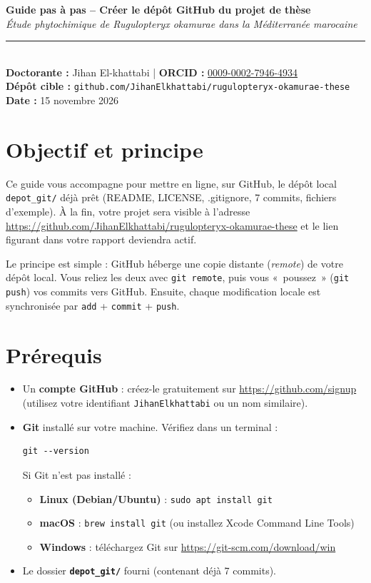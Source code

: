 \documentclass[11pt,a4paper]{article}
\begin{document}
\begin{center}
{\color{accent}\Large\bfseries Guide pas à pas -- Créer le dépôt GitHub du projet de thèse}\\[3pt]
{\large\itshape Étude phytochimique de \textit{Rugulopteryx okamurae} dans la Méditerranée marocaine}\\[4pt]
\rule{0.97\linewidth}{0.6pt}\\[3pt]
\small
\textbf{Doctorante :} Jihan El-khattabi \quad|\quad
\textbf{ORCID :} \href{https://orcid.org/0009-0002-7946-4934}{0009-0002-7946-4934}\\
\textbf{Dépôt cible :} \texttt{github.com/JihanElkhattabi/rugulopteryx-okamurae-these}\\
\textbf{Date :} 15 novembre 2026
\end{center}
\vspace{2pt}

\section{Objectif et principe}
Ce guide vous accompagne pour mettre en ligne, sur GitHub, le dépôt local
\texttt{depot\_git/} déjà prêt (README, LICENSE, .gitignore, 7 commits, fichiers
d'exemple). À la fin, votre projet sera visible à l'adresse
\url{https://github.com/JihanElkhattabi/rugulopteryx-okamurae-these} et le lien
figurant dans votre rapport deviendra actif.

Le principe est simple : GitHub héberge une copie distante (\emph{remote}) de votre
dépôt local. Vous reliez les deux avec \texttt{git remote}, puis vous «~poussez~»
(\texttt{git push}) vos commits vers GitHub. Ensuite, chaque modification locale est
synchronisée par \texttt{add} + \texttt{commit} + \texttt{push}.

\section{Prérequis}
\begin{itemize}
  \item Un \textbf{compte GitHub} : créez-le gratuitement sur \url{https://github.com/signup}
        (utilisez votre identifiant \texttt{JihanElkhattabi} ou un nom similaire).
  \item \textbf{Git} installé sur votre machine. Vérifiez dans un terminal :
\begin{lstlisting}
git --version
\end{lstlisting}
        Si Git n'est pas installé :
        \begin{itemize}
          \item \textbf{Linux (Debian/Ubuntu)} : \texttt{sudo apt install git}
          \item \textbf{macOS} : \texttt{brew install git} (ou installez Xcode Command Line Tools)
          \item \textbf{Windows} : téléchargez Git sur \url{https://git-scm.com/download/win}
        \end{itemize}
  \item Le dossier \textbf{\texttt{depot\_git/}} fourni (contenant déjà 7 commits).
\end{itemize}
\end{document}
